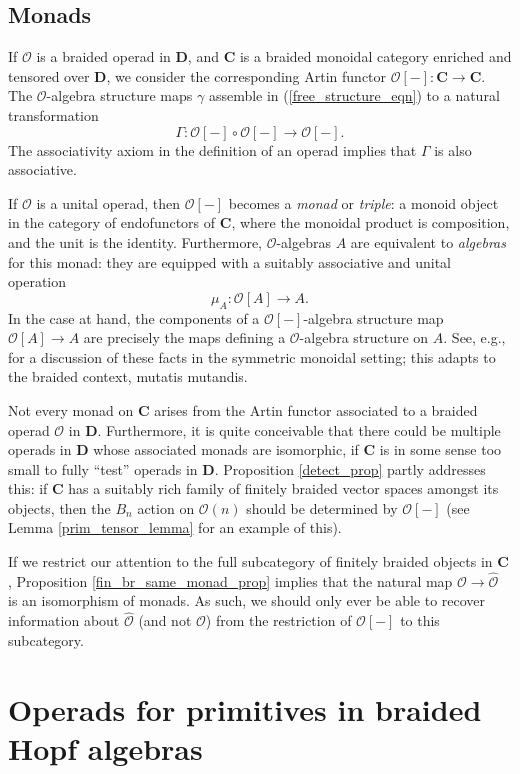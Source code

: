 \documentclass[12pt]{article}
\newcommand{\bC} {\mathbf{C}}
\newcommand{\bD} {\mathbf{D}}
\newcommand{\OO}{\mathcal{O}}
\newcommand{\OOhat}{\widehat{\OO}}
\theoremstyle{plain}
\theoremstyle{definition}
\theoremstyle{remark}
\begin{document}
\subsection{Monads} \label{monad_sec}

If $\OO$ is a braided operad in $\bD$, and $\bC$ is a braided monoidal category enriched and tensored over $\bD$, we consider the corresponding Artin functor $\OO[-]: \bC \to \bC$.  The $\OO$-algebra structure maps $\gamma$ assemble in (\ref{free_structure_eqn}) to a natural transformation 
%
$$\Gamma: \OO[-] \circ \OO[-] \to \OO[-].$$
%
The associativity axiom in the definition of an operad implies that $\Gamma$ is also associative.  

If $\OO$ is a unital operad, then $\OO[-]$ becomes a \emph{monad} or \emph{triple}: a monoid object in the category of endofunctors of $\bC$, where the monoidal product is composition, and the unit is the identity.  Furthermore, $\OO$-algebras $A$ are equivalent to \emph{algebras} for this monad: they are equipped with a suitably associative and unital operation
%
$$\mu_A: \OO[A] \to A.$$
%
In the case at hand, the components of a $\OO[-]$-algebra structure map $\OO[A] \to A$ are precisely the maps defining a $\OO$-algebra structure on $A$.  See, e.g., \cite{may} for a discussion of these facts in the symmetric monoidal setting; this adapts to the braided context, mutatis mutandis.

Not every monad on $\bC$ arises from the Artin functor associated to a braided operad $\OO$ in $\bD$.  Furthermore, it is quite conceivable that there could be multiple operads in $\bD$ whose associated monads are isomorphic, if $\bC$ is in some sense too small to fully ``test'' operads in $\bD$.  Proposition \ref{detect_prop} partly addresses this: if $\bC$ has a suitably rich family of finitely braided vector spaces amongst its objects, then the $B_n$ action on $\OO(n)$ should be determined by $\OO[-]$ (see Lemma \ref{prim_tensor_lemma} for an example of this).

If we restrict our attention to the full subcategory of finitely braided objects in $\bC$, Proposition \ref{fin_br_same_monad_prop} implies that the natural map $\OO \to \OOhat$ is an isomorphism of monads.   As such, we should only ever be able to recover information about $\OOhat$ (and not $\OO$) from the restriction of $\OO[-]$ to this subcategory. 



\section{Operads for primitives in braided Hopf algebras}
\end{document}
